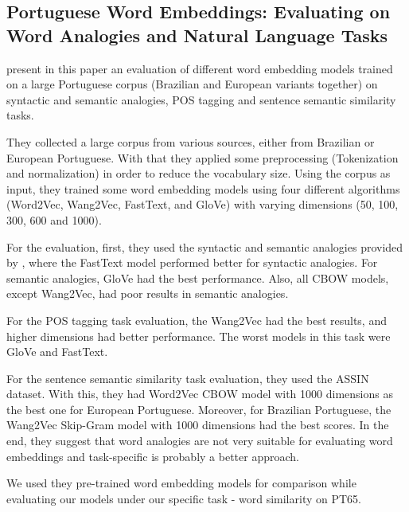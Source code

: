 \subsection{Portuguese Word Embeddings: Evaluating on Word Analogies and Natural
Language Tasks}

 present in this paper an evaluation of different word embedding models trained on a large Portuguese corpus (Brazilian and European variants together) on syntactic and semantic analogies, POS tagging and sentence semantic similarity tasks.

They collected a large corpus from various sources, either from Brazilian or European Portuguese. With that they applied some preprocessing (Tokenization and normalization) in order to reduce the vocabulary size. Using the corpus as input, they trained some word embedding models using four different algorithms (Word2Vec, Wang2Vec, FastText, and GloVe) with varying dimensions (50, 100, 300, 600 and 1000).

For the evaluation, first, they used the syntactic and semantic analogies provided by , where the FastText model performed better for syntactic analogies. For semantic analogies, GloVe had the best performance. Also, all CBOW models, except Wang2Vec, had poor results in semantic analogies.

For the POS tagging task evaluation, the Wang2Vec had the best results, and higher dimensions had better performance. The worst models in this task were GloVe and FastText. 

For the sentence semantic similarity task evaluation, they used the ASSIN dataset. With this, they had Word2Vec CBOW model with 1000 dimensions as the best one for European Portuguese. Moreover, for Brazilian Portuguese, the Wang2Vec Skip-Gram model with 1000 dimensions had the best scores.
In the end, they suggest that word analogies are not very suitable for evaluating word embeddings and task-specific is probably a better approach.

We used they pre-trained word embedding models for comparison while evaluating our models under our specific task - word similarity on PT65.






